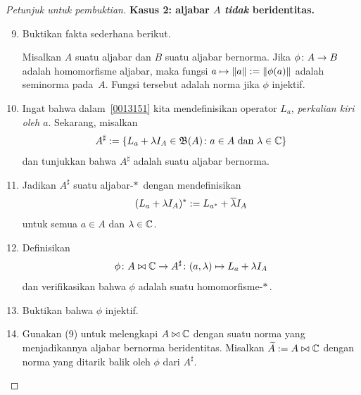 \begin{proof}[\emph{Petunjuk untuk pembuktian}]
\noindent\textbf{Kasus 2: aljabar $A$ \emph{tidak} beridentitas.}
\begin{enumerate}
\setcounter{enumi}{8}
    \item Buktikan fakta sederhana berikut.
  \begin{lem} Misalkan $A$ suatu aljabar dan $B$ suatu aljabar bernorma. Jika
  $\phi\colon A \rightarrow B$ adalah homomorfisme aljabar, maka fungsi
  $a \mapsto \lVert a\rVert := \lVert\phi(a)\rVert$ adalah seminorma pada~$A$. Fungsi tersebut adalah
  norma jika $\phi$ injektif.
  \end{lem}
    \item Ingat bahwa dalam~\ref{0013151} kita mendefinisikan operator $L_a$,
\emph{perkalian kiri oleh $a$}. Sekarang, misalkan
      \[ A^{\sharp} :=
        \{ L_a + \lambda I_A \in \mathfrak{B}(A)\colon a \in A \text{ dan } \lambda \in \mathbb{C}\} \]
dan tunjukkan bahwa $A^\sharp$ adalah suatu aljabar bernorma.
    \item Jadikan $A^\sharp$ suatu aljabar-$*\,$ dengan mendefinisikan
      \[ (L_a + \lambda I_A)^* := L_{a^*} + \overline{\lambda} I_A \]
untuk semua $a \in A$ dan $\lambda \in \mathbb{C}$.
    \item Definisikan
      \[ \phi\colon A \bowtie \mathbb{C} \rightarrow A^\sharp\colon
                   (a,\lambda) \mapsto L_a + \lambda I_A \]
dan verifikasikan bahwa $\phi$ adalah suatu homomorfisme-$*\,$.
    \item Buktikan bahwa $\phi$ injektif.
    \item Gunakan (9) untuk melengkapi $A \bowtie \mathbb{C}$ dengan suatu norma yang
menjadikannya aljabar bernorma beridentitas. Misalkan $\widetilde{A} := A \bowtie \mathbb{C}$ dengan
    norma yang ditarik balik oleh $\phi$ dari $A^\sharp$.



\end{enumerate}
\end{proof}
